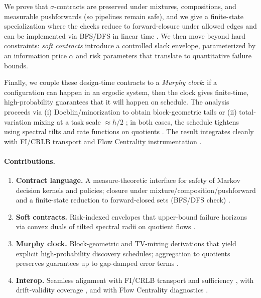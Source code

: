 \documentclass[11pt]{article}
\theoremstyle{plain}
\theoremstyle{definition}
\theoremstyle{remark}
\newcommand{\1}{\mathbbm{1}}
\begin{document}
We prove that \(\sigma\)-contracts are preserved under mixtures, compositions, and measurable pushforwards (so pipelines remain safe), and we give a finite-state specialization where the checks reduce to forward-closure under allowed edges and can be implemented via BFS/DFS in linear time \parencite[Ch.~22]{Cormen2009}. We then move beyond hard constraints: \emph{soft contracts} introduce a controlled slack envelope, parameterized by an information price \(\alpha\) and risk parameters that translate to quantitative failure bounds.

Finally, we couple these design-time contracts to a \emph{Murphy clock}: if a configuration can happen in an ergodic system, then the clock gives finite-time, high-probability guarantees that it will happen on schedule. The analysis proceeds via (i) Doeblin/minorization to obtain block-geometric tails \parencite[Chs.~15--16]{MeynTweedie2009} or (ii) total-variation mixing at a task scale \(\approx h/2\) \parencite{LevinPeresWilmer2009}; in both cases, the schedule tightens using spectral tilts and rate functions on quotients \parencite{DemboZeitouni1998,elliott2025qfi}. The result integrates cleanly with FI/CRLB transport \parencite{Blackwell1953,AmariNagaoka2000,Cencov1982,elliott2025idiom} and Flow Centrality instrumentation \parencite{elliott2025flow,Freeman1977,Newman2005}.

\paragraph{Contributions.}
\begin{enumerate}[leftmargin=1.35em]
\item \textbf{Contract language.} A measure-theoretic interface for safety of Markov decision kernels and policies; closure under mixture/composition/pushforward and a finite-state reduction to forward-closed sets (BFS/DFS check) \parencite{Bogachev2007,Cormen2009}.
\item \textbf{Soft contracts.} Risk-indexed envelopes that upper-bound failure horizons via convex duals of tilted spectral radii on quotient flows \parencite{DemboZeitouni1998,elliott2025qfi}.
\item \textbf{Murphy clock.} Block-geometric and TV-mixing derivations that yield explicit high-probability discovery schedules; aggregation to quotients preserves guarantees up to gap-damped error terms \parencite{MeynTweedie2009,LevinPeresWilmer2009,elliott2025qfi}.
\item \textbf{Interop.} Seamless alignment with FI/CRLB transport and sufficiency \parencite{Blackwell1953,AmariNagaoka2000,Cencov1982,elliott2025idiom}, with drift-validity coverage \parencite{elliott2025drift,KochenStone1964,Freedman1975}, and with Flow Centrality diagnostics \parencite{elliott2025flow}.
\end{enumerate}
\end{document}

